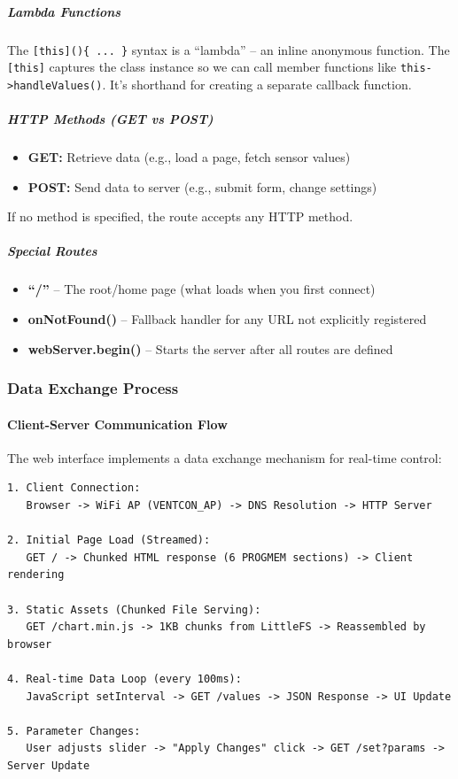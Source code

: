\documentclass[12pt,a4paper]{article}
\begin{document}
\subparagraph{Lambda Functions}
The \texttt{[this]()\{ ... \}} syntax is a ``lambda'' -- an inline anonymous function. The \texttt{[this]} captures the class instance so we can call member functions like \texttt{this->handleValues()}. It's shorthand for creating a separate callback function.

\subparagraph{HTTP Methods (GET vs POST)}
\begin{itemize}
    \item \textbf{GET:} Retrieve data (e.g., load a page, fetch sensor values)
    \item \textbf{POST:} Send data to server (e.g., submit form, change settings)
\end{itemize}
If no method is specified, the route accepts any HTTP method.

\subparagraph{Special Routes}
\begin{itemize}
    \item \textbf{``/''} -- The root/home page (what loads when you first connect)
    \item \textbf{onNotFound()} -- Fallback handler for any URL not explicitly registered
    \item \textbf{webServer.begin()} -- Starts the server after all routes are defined
\end{itemize}

\subsubsection{Data Exchange Process}

\paragraph{Client-Server Communication Flow}
The web interface implements a data exchange mechanism for real-time control:

\begin{lstlisting}[caption=Data Exchange Sequence]
1. Client Connection:
   Browser -> WiFi AP (VENTCON_AP) -> DNS Resolution -> HTTP Server

2. Initial Page Load (Streamed):
   GET / -> Chunked HTML response (6 PROGMEM sections) -> Client rendering

3. Static Assets (Chunked File Serving):
   GET /chart.min.js -> 1KB chunks from LittleFS -> Reassembled by browser

4. Real-time Data Loop (every 100ms):
   JavaScript setInterval -> GET /values -> JSON Response -> UI Update

5. Parameter Changes:
   User adjusts slider -> "Apply Changes" click -> GET /set?params -> Server Update
\end{lstlisting}
\end{document}
